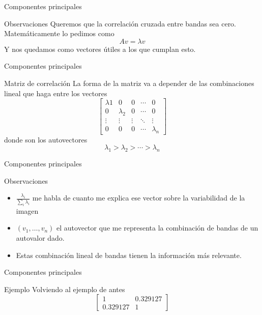 \documentclass[]{beamer}
\begin{document}
\begin{frame}{Componentes principales}
  \begin{block}{Observaciones}
      Queremos que la correlación cruzada entre bandas sea cero.
      \pause\@ Matemáticamente lo pedimos como
        $$Av=\lambda v$$
      Y nos quedamos como vectores útiles a los que cumplan esto.
  \end{block}
\end{frame}

\begin{frame}{Componentes principales}
  \begin{block}{Matriz de correlación}
    La forma de la matriz va a depender de las combinaciones lineal que haga
      entre los vectores \pause\@
    \[\begin{bmatrix}
        \lambda{1}       & 0 & 0 & \cdots & 0 \\
        0       & \lambda_{2} & 0 & \cdots & 0 \\
        \vdots & \vdots & \vdots & \ddots & \vdots \\
        0       & 0 & 0 & \cdots & \lambda_{n}
    \end{bmatrix} \]
    \pause\@
    donde son los autovectores $$\lambda_{1}  > \lambda_{2} > \cdots > \lambda_{n}$$
  \end{block}
\end{frame}

\begin{frame}{Componentes principales}
  \begin{block}{Observaciones}
    \begin{itemize}[<+>]
      \item $\frac{\lambda_i}{\sum_i \lambda_i}$ me habla de cuanto me explica ese vector sobre la variabilidad de la imagen
      \item $(v_1 , \dots , v_n)$ el autovector que me representa la combinación de bandas de un autovalor dado.
      \item Estas combinación lineal de bandas tienen la información más relevante.
    \end{itemize}
  \end{block}
\end{frame}

\begin{frame}{Componentes principales}
  \begin{exampleblock}{Ejemplo}
    Volviendo al ejemplo de antes
    \[
    \begin{bmatrix}
        1       & 0.329127 \\
        0.329127 & 1
    \end{bmatrix} \]
  \end{exampleblock}
\end{frame}
\end{document}

